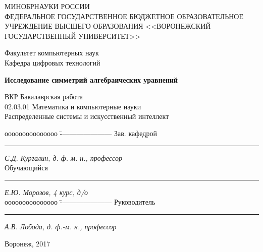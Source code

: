 \documentclass[../main.tex]{subfiles}
\begin{document}
\thispagestyle{empty}
\center 
\textsc{МИНОБРНАУКИ РОССИИ}\\
\textsc{ФЕДЕРАЛЬНОЕ ГОСУДАРСТВЕННОЕ БЮДЖЕТНОЕ ОБРАЗОВАТЕЛЬНОЕ УЧРЕЖДЕНИЕ ВЫСШЕГО ОБРАЗОВАНИЯ <<ВОРОНЕЖСКИЙ ГОСУДАРСТВЕННЫЙ УНИВЕРСИТЕТ>>}

\vspace{0.3cm}

\textrm{Факультет компьютерных наук}\\
\textrm{Кафедра цифровых технологий}

\vspace{1cm}

\textbf{Исследование симметрий алгебраических уравнений}\\

\vspace{1cm}

\textrm{ВКР Бакалаврская работа}\\
\textrm{02.03.01 Математика и компьютерные науки}\\
\textrm{Распределенные системы и искусственный интеллект}\\

\vfill
{}
\begin{tabbing}
ооооооооооооооо	\=	----------------------	\kill
Зав. кафедрой	\> 	\rule[0mm]{5cm}{0,3mm}	\textit{С.Д. Кургалин, д. ф.-м. н., профессор}  \\
Обучающийся 	\> 	\rule[0mm]{5cm}{0,3mm}	\textit{Е.Ю. Морозов, 4 курс, д/о} \\ 
ооооооооооооооо	\=	----------------------	\kill
Руководитель	\> 	\rule[0mm]{5cm}{0,3mm}  \textit{А.В. Лобода, д. ф.-м. н., профессор}
\end{tabbing}

\vfill

\centerline{Воронеж, 2017}
\clearpage
\end{document}
